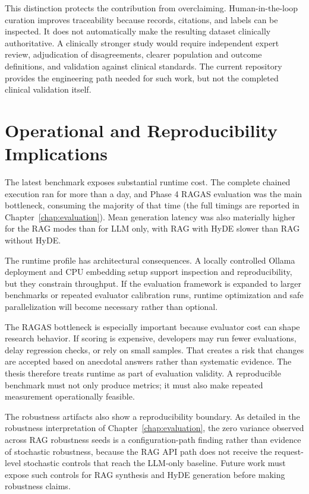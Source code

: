 This distinction protects the contribution from overclaiming. Human-in-the-loop curation improves traceability because records, citations, and labels can be inspected. It does not automatically make the resulting dataset clinically authoritative. A clinically stronger study would require independent expert review, adjudication of disagreements, clearer population and outcome definitions, and validation against clinical standards. The current repository provides the engineering path needed for such work, but not the completed clinical validation itself.

\section{Operational and Reproducibility Implications}

The latest benchmark exposes substantial runtime cost. The complete chained execution ran for more than a day, and Phase 4 RAGAS evaluation was the main bottleneck, consuming the majority of that time (the full timings are reported in Chapter~\ref{chap:evaluation}). Mean generation latency was also materially higher for the RAG modes than for LLM only, with RAG with HyDE slower than RAG without HyDE.

The runtime profile has architectural consequences. A locally controlled Ollama deployment and CPU embedding setup support inspection and reproducibility, but they constrain throughput. If the evaluation framework is expanded to larger benchmarks or repeated evaluator calibration runs, runtime optimization and safe parallelization will become necessary rather than optional.

The RAGAS bottleneck is especially important because evaluator cost can shape research behavior. If scoring is expensive, developers may run fewer evaluations, delay regression checks, or rely on small samples. That creates a risk that changes are accepted based on anecdotal answers rather than systematic evidence. The thesis therefore treats runtime as part of evaluation validity. A reproducible benchmark must not only produce metrics; it must also make repeated measurement operationally feasible.

The robustness artifacts also show a reproducibility boundary. As detailed in the robustness interpretation of Chapter~\ref{chap:evaluation}, the zero variance observed across RAG robustness seeds is a configuration-path finding rather than evidence of stochastic robustness, because the RAG API path does not receive the request-level stochastic controls that reach the LLM-only baseline. Future work must expose such controls for RAG synthesis and HyDE generation before making robustness claims.

